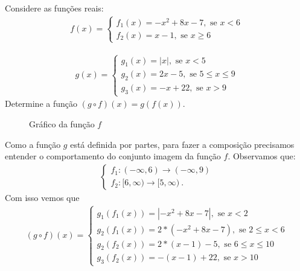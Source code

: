 \begin{exem}
Considere as funções reais:
\begin{eqnarray}
f(x)= \begin{cases}
      f_1(x)= -x^2+8x-7, \text{ se } x < 6 \\
      f_2(x)= x-1, \text{ se } x \geqslant 6
      \end{cases}
\end{eqnarray}

\begin{eqnarray}
g(x)= \begin{cases}
      g_1(x)= |x|, \text{ se } x < 5 \\
      g_2(x)= 2x-5, \text{ se } 5 \leqslant x \leqslant 9 \\
      g_3(x)= -x+22, \text{ se } x > 9
      \end{cases}
\end{eqnarray}
Determine a função $(g \circ f)(x)= g(f(x))$.

  \begin{figure}[H]
 \centering
    \caption{Gráfico da função $f$}
  \end{figure}

\begin{resol}
Como a função $g$ está definida por partes, para fazer a composição precisamos entender o comportamento do conjunto imagem da função $f$. Observamos que:
\begin{eqnarray}
\begin{cases}
f_1: (-\infty, 6) \to (-\infty, 9) \\
f_2: [6, \infty) \to [5, \infty) \ .
\end{cases}
\end{eqnarray}
 Com isso vemos que 
 \begin{eqnarray}
(g \circ f)(x)= \begin{cases}
      g_1(f_1(x))= |-x^2+8x-7|, \text{ se } x < 2 \\
      g_2(f_1(x))= 2*(-x^2+8x-7), \text{ se } 2 \leqslant x < 6 \\
      g_2(f_2(x))= 2*(x-1)-5, \text{ se } 6 \leqslant x \leqslant 10 \\
      g_3(f_2(x))= -(x-1)+22, \text{ se } x > 10
      \end{cases}
\end{eqnarray}
\end{resol}
\end{exem}

